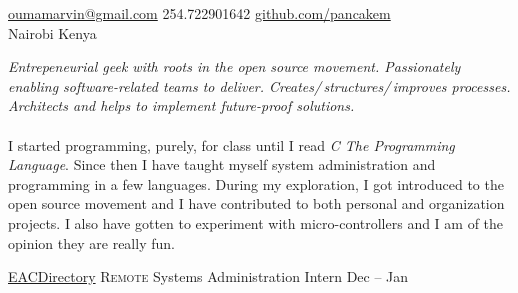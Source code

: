 \documentclass[10pt,a4paper]{article}
\begin{document}
\sloppy  %



\nobreakvspace{0.3em}  %

\noindent\href{mailto:oumamarvin.at.gmail.dot.com}{oumamarvin\mbox{}@\mbox{}gmail.com}\sbull
\textsmaller{+}254.722901642\sbull
\href{https://github.com/pancakem}{github.com/pancakem}\sbull
\\
Nairobi \sbull
Kenya

\spacedhrule{0.9em}{-0.4em}  %


\vspace{-1.3em}  %
\begin{multicols}{2}  %
\noindent \emph{Entrepeneurial geek with roots in the open source movement. Passionately enabling software-related teams to deliver. Creates/\,structures/\,improves processes. Architects and helps to implement future-proof solutions.}
\\
\\
I started programming, purely, for class until I read \emph{C The
  Programming Language}. Since then I have taught myself system
administration and programming in a few languages. During my
exploration, I got introduced to the open source movement and I have
contributed to both personal and organization projects. I also have
gotten to experiment with micro-controllers and I am of the opinion
they are really fun.
\end{multicols}


\spacedhrule{0em}{-0.4em}

\headedsection
  {\href{https://eacdirectory.co.ke}{EACDirectory}}
  {\textsc{Remote}} {%
  \headedsubsection
    {Systems Administration Intern}
    {Dec  -- Jan }
    {}
}
\end{document}

